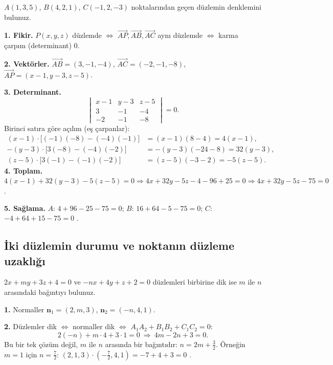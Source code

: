 \begin{soru}
$A(1,3,5)$, $B(4,2,1)$, $C(-1,2,-3)$ noktalarından geçen düzlemin denklemini bulunuz.
\end{soru}
\begin{cevap}
\textbf{1. Fikir.} $P(x,y,z)$ düzlemde $\iff$ $\overrightarrow{AP},\overrightarrow{AB},\overrightarrow{AC}$ aynı düzlemde $\iff$ karma çarpım (determinant) $0$.

\textbf{2. Vektörler.} $\overrightarrow{AB}=(3,-1,-4)$, $\overrightarrow{AC}=(-2,-1,-8)$, $\overrightarrow{AP}=(x-1,y-3,z-5)$.

\textbf{3. Determinant.}
\[ \begin{vmatrix}x-1&y-3&z-5\\3&-1&-4\\-2&-1&-8\end{vmatrix}=0 . \]
Birinci satıra göre açılım (eş çarpanlar):
\begin{align*}
(x-1)\cdot\big[(-1)(-8)-(-4)(-1)\big]&=(x-1)(8-4)=4(x-1),\\
-(y-3)\cdot\big[3(-8)-(-4)(-2)\big]&=-(y-3)(-24-8)=32(y-3),\\
(z-5)\cdot\big[3(-1)-(-1)(-2)\big]&=(z-5)(-3-2)=-5(z-5).
\end{align*}
\textbf{4. Toplam.} $4(x-1)+32(y-3)-5(z-5)=0\Rightarrow4x+32y-5z-4-96+25=0\Rightarrow\boxed{4x+32y-5z-75=0}$.

\textbf{5. Sağlama.} $A$: $4+96-25-75=0$; $B$: $16+64-5-75=0$; $C$: $-4+64+15-75=0$ \checkmark.
\end{cevap}

\subsection{İki düzlemin durumu ve noktanın düzleme uzaklığı}

\begin{soru}
$2x+my+3z+4=0$ ve $-nx+4y+z+2=0$ düzlemleri birbirine dik ise $m$ ile $n$ arasındaki bağıntıyı bulunuz.
\end{soru}
\begin{cevap}
\textbf{1.} Normaller $\mathbf n_1=(2,m,3)$, $\mathbf n_2=(-n,4,1)$.

\textbf{2.} Düzlemler dik $\iff$ normaller dik $\iff$ $A_1A_2+B_1B_2+C_1C_2=0$:
\[ 2(-n)+m\cdot4+3\cdot1=0\ \Longrightarrow\ \boxed{4m-2n+3=0}. \]
Bu bir tek çözüm değil, $m$ ile $n$ arasında bir bağıntıdır: $n=2m+\frac32$. Örneğin $m=1$ için $n=\frac72$: $(2,1,3)\cdot(-\frac72,4,1)=-7+4+3=0$ \checkmark.
\end{cevap}

